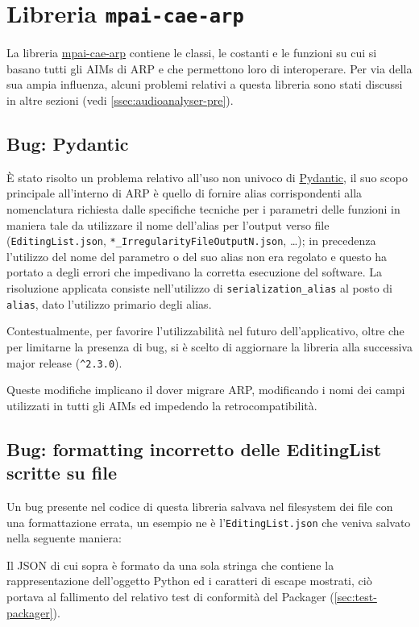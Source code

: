 \section{Libreria \texttt{mpai-cae-arp}} \label{sec:lib-mpaicaearp} %
La libreria \href{https://pypi.org/project/mpai-cae-arp/}{mpai-cae-arp} contiene le classi, le costanti e le funzioni su cui si basano tutti gli \acp{AIM} di \ac{ARP} e che permettono loro di interoperare.
Per via della sua ampia influenza, alcuni problemi relativi a questa libreria sono stati discussi in altre sezioni (vedi \ref{ssec:audioanalyser-pre}).


\subsection{Bug: Pydantic} \label{ssec:mpaicaearp-pydantic}    %
È stato risolto un problema relativo all'uso non univoco di \href{https://docs.pydantic.dev/1.10/}{Pydantic}, il suo scopo principale all'interno di \ac{ARP} è quello di fornire alias corrispondenti alla nomenclatura richiesta dalle specifiche tecniche per i parametri delle funzioni in maniera tale da utilizzare il nome dell'alias per l'output verso file (\texttt{EditingList.json}, \verb|*_IrregularityFileOutputN.json|, \dots); in precedenza l'utilizzo del nome del parametro o del suo alias non era regolato e questo ha portato a degli errori che impedivano la corretta esecuzione del software.
La risoluzione applicata consiste nell'utilizzo di \verb|serialization_alias| al posto di \texttt{alias}, dato l'utilizzo primario degli alias.

Contestualmente, per favorire l'utilizzabilità nel futuro dell'applicativo, oltre che per limitarne la presenza di bug, si è scelto di aggiornare la libreria alla successiva major release (\verb|^2.3.0|).

Queste modifiche implicano il dover migrare \ac{ARP}, modificando i nomi dei campi utilizzati in tutti gli \acp{AIM} ed impedendo la retrocompatibilità.


\subsection{Bug: formatting incorretto delle EditingList scritte su file} \label{ssec:mpaicaearp-formato-editinglist}
Un bug presente nel codice di questa libreria salvava nel filesystem dei file con una formattazione errata, un esempio ne è l'\texttt{EditingList.json} che veniva salvato nella seguente maniera:

Il JSON di cui sopra è formato da una sola stringa che contiene la rappresentazione dell'oggetto Python ed i caratteri di escape mostrati, ciò portava al fallimento del relativo test di conformità del Packager (\ref{sec:test-packager}).

